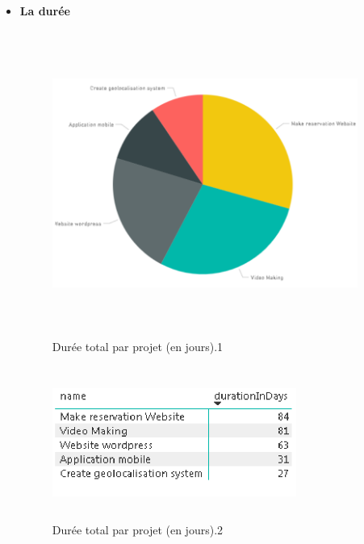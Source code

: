 \begin{itemize}
\item{ \textbf{La dur\'{e}e}  }
\FloatBarrier
\begin{figure}[H]
\center
\includegraphics[width=10cm,height=10cm]{./figures/rpb4.png}
\caption{Dur\'{e}e total par projet (en jours).1}

\end{figure}
\FloatBarrier

\FloatBarrier
\begin{figure}[H]
\center
\includegraphics[width=8cm,height=5cm]{./figures/rpb42.png}
\caption{Dur\'{e}e total par projet (en jours).2}

\end{figure}
\FloatBarrier


\end{itemize}




















































